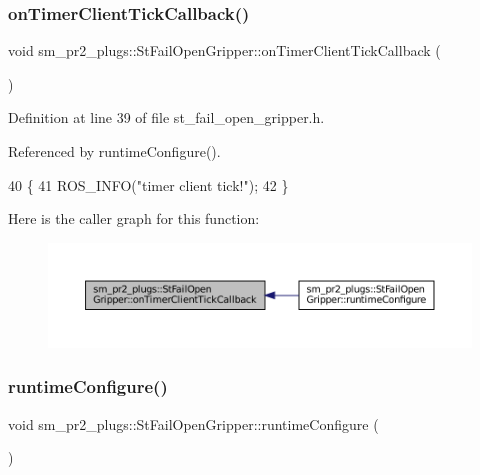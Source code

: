 \subsubsection{\texorpdfstring{on\+Timer\+Client\+Tick\+Callback()}{onTimerClientTickCallback()}}
{\footnotesize\ttfamily void sm\+\_\+pr2\+\_\+plugs\+::\+St\+Fail\+Open\+Gripper\+::on\+Timer\+Client\+Tick\+Callback (\begin{DoxyParamCaption}{ }\end{DoxyParamCaption})\hspace{0.3cm}{\ttfamily [inline]}}



Definition at line 39 of file st\+\_\+fail\+\_\+open\+\_\+gripper.\+h.



Referenced by runtime\+Configure().


\begin{DoxyCode}
40     \{
41         ROS\_INFO(\textcolor{stringliteral}{"timer client tick!"});
42     \}
\end{DoxyCode}
Here is the caller graph for this function\+:
\nopagebreak
\begin{figure}[H]
\begin{center}
\leavevmode
\includegraphics[width=350pt]{structsm__pr2__plugs_1_1StFailOpenGripper_a61f887a4b8a6884466df6bdf96af3936_icgraph}
\end{center}
\end{figure}
\mbox{\label{structsm__pr2__plugs_1_1StFailOpenGripper_a9972024358d52891ff6ff0282f1abfba}} 
\subsubsection{\texorpdfstring{runtime\+Configure()}{runtimeConfigure()}}
{\footnotesize\ttfamily void sm\+\_\+pr2\+\_\+plugs\+::\+St\+Fail\+Open\+Gripper\+::runtime\+Configure (\begin{DoxyParamCaption}{ }\end{DoxyParamCaption})\hspace{0.3cm}{\ttfamily [inline]}}



